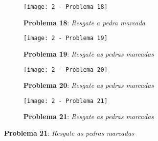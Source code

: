 \begin{figure}[p!]
\begin{subfigure}[t]{.3\textwidth}
        \texttt{[image: 2 - Problema 18]}
        \caption*{\textbf{Problema 18}: \emph{Resgate a pedra marcada}}
    \end{subfigure}
    \par\bigskip
    \begin{subfigure}[t]{.3\textwidth}
        \texttt{[image: 2 - Problema 19]}
        \caption*{\textbf{Problema 19}: \emph{Resgate as pedras marcadas}}
    \end{subfigure}
    \hfill
    \begin{subfigure}[t]{.3\textwidth}
        \texttt{[image: 2 - Problema 20]}
        \caption*{\textbf{Problema 20}: \emph{Resgate as pedras marcadas}}
    \end{subfigure}
    \hfill
    \begin{subfigure}[t]{.3\textwidth}
        \texttt{[image: 2 - Problema 21]}
        \caption*{\textbf{Problema 21}: \emph{Resgate as pedras marcadas}}
    \end{subfigure}
\end{figure}

